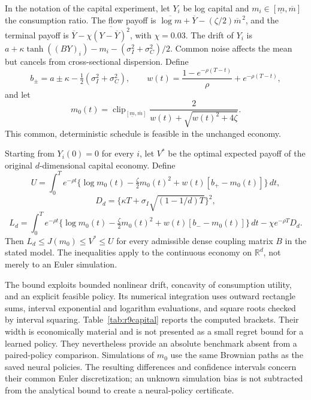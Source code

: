 In the notation of the capital experiment, let $Y_i$ be log capital and $m_i\in[\underline m,\overline m]$ the consumption ratio. The flow payoff is $\overline{\log m}+\overline Y-(\zeta/2)\overline m^{\,2}$, and the terminal payoff is $\overline Y-\chi\overline{(Y-\overline Y)^2}$, with $\chi=0.03$. The drift of $Y_i$ is $a+\kappa\tanh((BY)_i)-m_i-(\sigma_I^2+\sigma_C^2)/2$. Common noise affects the mean but cancels from cross-sectional dispersion. Define
\[
 b_\pm=a\pm\kappa-\tfrac12(\sigma_I^2+\sigma_C^2),\qquad
 w(t)=\frac{1-e^{-\rho(T-t)}}{\rho}+e^{-\rho(T-t)},
\]
and let
\[
 m_0(t)=\operatorname{clip}_{[\underline m,\overline m]}
 \frac{2}{w(t)+\sqrt{w(t)^2+4\zeta}}.
\]
This common, deterministic schedule is feasible in the unchanged economy.

\begin{proposition}\label{prop:r9capital}
Starting from $Y_i(0)=0$ for every $i$, let $V^*$ be the optimal expected payoff of the original $d$-dimensional capital economy. Define
\[
 U=\int_0^T e^{-\rho t}\{\log m_0(t)-\tfrac{\zeta}{2}m_0(t)^2+w(t)[b_+-m_0(t)]\}\,dt,
\]
\[
 D_d=\{\kappa T+\sigma_I\sqrt{(1-1/d)T}\}^{2},
\]
\[
 L_d=\int_0^T e^{-\rho t}\{\log m_0(t)-\tfrac{\zeta}{2}m_0(t)^2+w(t)[b_--m_0(t)]\}\,dt
 -\chi e^{-\rho T}D_d.
\]
Then $L_d\leq J(m_0)\leq V^*\leq U$ for every admissible dense coupling matrix $B$ in the stated model. The inequalities apply to the continuous economy on $\mathbb R^d$, not merely to an Euler simulation.
\end{proposition}

The bound exploits bounded nonlinear drift, concavity of consumption utility, and an explicit feasible policy. Its numerical integration uses outward rectangle sums, interval exponential and logarithm evaluations, and square roots checked by interval squaring. Table~\ref{tab:r9capital} reports the computed brackets. Their width is economically material and is not presented as a small regret bound for a learned policy. They nevertheless provide an absolute benchmark absent from a paired-policy comparison. Simulations of $m_0$ use the same Brownian paths as the saved neural policies. The resulting differences and confidence intervals concern their common Euler discretization; an unknown simulation bias is not subtracted from the analytical bound to create a neural-policy certificate.

